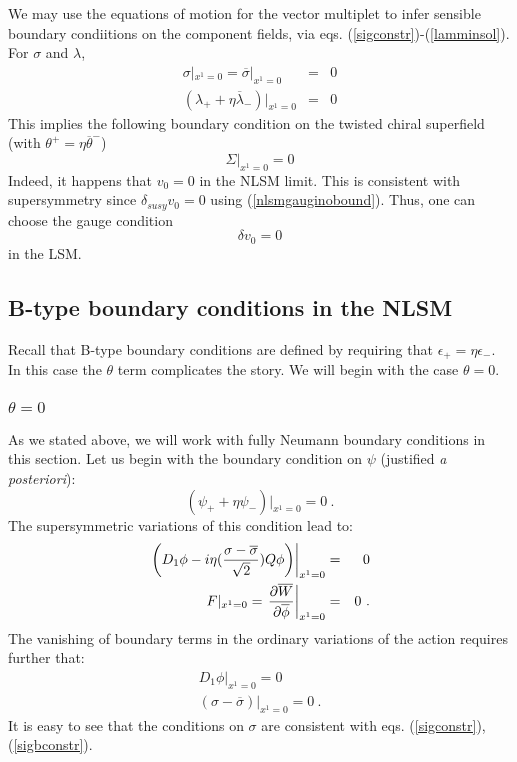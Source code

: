 \documentclass[a4paper,12pt]{article}
\begin{document}
We may use the equations of motion for the vector multiplet to
infer sensible boundary condiitions on the
component fields, via eqs. (\ref{sigconstr})-(\ref{lamminsol}).
For $\sigma$ and $\lambda$,
\begin{eqnarray}
\sigma|_{x^1=0}=\overline{\sigma}|_{x^1=0}&=&0 \\
(\lambda_+ + \eta \overline{\lambda}_-)|_{x^1=0} &=&0
\label{nlsmgauginobound}
\end{eqnarray}
This implies the following boundary condition on the twisted chiral
superfield (with $\theta^+=\eta \overline{\theta}^-$)
\begin{equation}
\Sigma|_{x^1=0}=0
\end{equation}
Indeed, it happens that $v_0=0$ in the NLSM limit.  This
is consistent with supersymmetry since
$\delta_{susy}v_0=0$ using (\ref{nlsmgauginobound}).
Thus, one can choose the gauge condition 
\begin{equation}
\delta v_0 =0
\end{equation}
in the LSM.

\subsection{B-type boundary conditions in the NLSM}

Recall that B-type boundary conditions are defined by requiring that 
$\epsilon_+ = \eta \epsilon_-$.
In this case the $\theta$ term complicates the story.
We will begin with the case $\theta = 0$.

\subsubsection{$\theta=0$}

As we stated above, we will work with fully
Neumann boundary conditions in this section.
Let us begin with the boundary condition on $\psi$
(justified {\it a posteriori}):
\begin{equation}
(\psi_+ +\eta \psi_-)|_{x^1=0} = 0\ .
\end{equation}
The supersymmetric variations of this condition lead to:
\begin{eqnarray}
\left.\left(D_1\phi-i\eta({{\sigma-\overline{\sigma}}
	\over{\sqrt2}})Q\phi\right)
\right|_{x^1=0}&=&0 \\
F|_{x^1=0}=\left.{{\partial \overline{W}}\over{\partial\overline{\phi}}}
\right|_{x^1=0}&=&0 \ .
\end{eqnarray}
The vanishing of boundary terms in the ordinary variations of the action
requires further that:
\begin{eqnarray}
D_1\phi|_{x^1=0}=0 \\
(\sigma -\overline{\sigma})|_{x^1=0}=0\ .
\label{btypesigma}
\end{eqnarray}
It is easy to see that the conditions on $\sigma$ are
consistent with eqs. (\ref{sigconstr}),(\ref{sigbconstr}).
\end{document}
